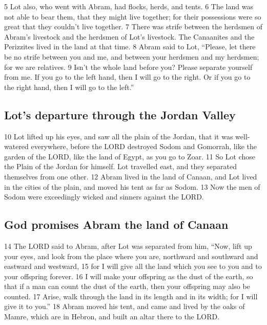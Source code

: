{5} Lot also, who went with Abram, had flocks, herds, and tents. {6} The
land was not able to bear them, that they might live together; for their
possessions were so great that they couldn't live together. {7} There
was strife between the herdsmen of Abram's livestock and the herdsmen of
Lot's livestock. The Canaanites and the Perizzites lived in the land at
that time. {8} Abram said to Lot, ``Please, let there be no strife
between you and me, and between your herdsmen and my herdsmen; for we
are relatives. {9} Isn't the whole land before you? Please separate
yourself from me. If you go to the left hand, then I will go to the
right. Or if you go to the right hand, then I will go to the left.''

\hypertarget{lots-departure-through-the-jordan-valley}{%
\subsection{Lot's departure through the Jordan
Valley}\label{lots-departure-through-the-jordan-valley}}

{10} Lot lifted up his eyes, and saw all the plain of the Jordan, that
it was well-watered everywhere, before the LORD destroyed Sodom and
Gomorrah, like the garden of the LORD, like the land of Egypt, as you go
to Zoar. {11} So Lot chose the Plain of the Jordan for himself. Lot
travelled east, and they separated themselves from one other. {12} Abram
lived in the land of Canaan, and Lot lived in the cities of the plain,
and moved his tent as far as Sodom. {13} Now the men of Sodom were
exceedingly wicked and sinners against the LORD.

\hypertarget{god-promises-abram-the-land-of-canaan}{%
\subsection{God promises Abram the land of
Canaan}\label{god-promises-abram-the-land-of-canaan}}

{14} The LORD said to Abram, after Lot was separated from him, ``Now,
lift up your eyes, and look from the place where you are, northward and
southward and eastward and westward, {15} for I will give all the land
which you see to you and to your offspring forever. {16} I will make
your offspring as the dust of the earth, so that if a man can count the
dust of the earth, then your offspring may also be counted. {17} Arise,
walk through the land in its length and in its width; for I will give it
to you.'' {18} Abram moved his tent, and came and lived by the oaks of
Mamre, which are in Hebron, and built an altar there to the LORD.

